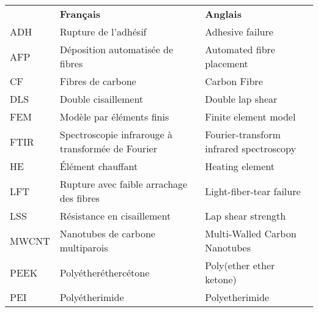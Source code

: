 \begin{longtable}{p{0.75in}>{\raggedright\arraybackslash}p{2.5in} p{2.5in}}
	      & \textbf{Français}                                                     & \textbf{Anglais}                                                         \\
	ADH   & Rupture de l'adhésif                                                  & Adhesive failure                                                         \\
	AFP   & Déposition automatisée de fibres                                      & Automated fibre placement                                                \\
	CF    & Fibres de carbone                                                     & Carbon Fibre                                                             \\
	DLS   & Double cisaillement                                                   & Double lap shear                                                         \\
	FEM   & Modèle par éléments finis                                             & Finite element model                                                     \\
	FTIR  & Spectroscopie infrarouge à transformée de Fourier                     & Fourier-transform infrared spectroscopy                                  \\
	HE    & Élément chauffant                                                     & Heating element                                                          \\
	LFT   & Rupture avec faible arrachage des fibres                              & Light-fiber-tear failure                                                 \\
	LSS   & Résistance en cisaillement                                            & Lap shear strength                                                       \\
	MWCNT & Nanotubes de carbone multiparois                                      & Multi-Walled Carbon Nanotubes                                            \\
	PEEK  & Polyétheréthercétone                                                  & Poly(ether ether ketone)                                                 \\
	PEI   & Polyétherimide                                                        & Polyetherimide                                                           \\

\end{longtable}
